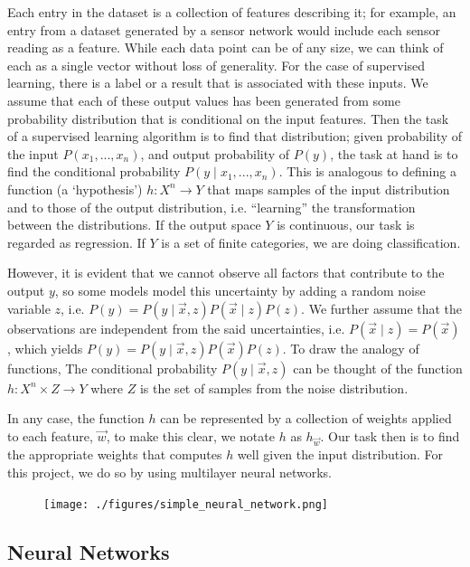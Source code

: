 \documentclass[12pt,a4paper,]{report}
\begin{document}
Each entry in the dataset is a collection of features describing it; for
example, an entry from a dataset generated by a sensor network would
include each sensor reading as a feature. While each data point can be
of any size, we can think of each as a single vector without loss of
generality. For the case of supervised learning, there is a label or a
result that is associated with these inputs. We assume that each of
these output values has been generated from some probability
distribution that is conditional on the input features. Then the task of
a supervised learning algorithm is to find that distribution; given
probability of the input \(P(x_1, ..., x_n)\), and output probability of
\(P(y)\), the task at hand is to find the conditional probability
\(P(y \mid x_1, ..., x_n)\). This is analogous to defining a function (a
`hypothesis') \(h: X^n \rightarrow Y\) that maps samples of the input
distribution and to those of the output distribution, i.e. ``learning''
the transformation between the distributions. If the output space \(Y\)
is continuous, our task is regarded as regression. If \(Y\) is a set of
finite categories, we are doing classification.

However, it is evident that we cannot observe all factors that
contribute to the output \(y\), so some models model this uncertainty by
adding a random noise variable \(z\), i.e.
\(P(y) = P(y \mid \vec{x}, z) P(\vec{x} \mid z) P(z)\). We further
assume that the observations are independent from the said
uncertainties, i.e. \(P(\vec{x} \mid z) = P(\vec{x})\), which yields
\(P(y) = P(y \mid \vec{x}, z) P(\vec{x}) P(z)\). To draw the analogy of
functions, The conditional probability \(P(y \mid \vec{x}, z)\) can be
thought of the function \(h: X^n \times Z \rightarrow Y\) where \(Z\) is
the set of samples from the noise distribution.

In any case, the function \(h\) can be represented by a collection of
weights applied to each feature, \(\vec{w}\), to make this clear, we
notate \(h\) as \(h_{\vec{w}}\). Our task then is to find the
appropriate weights that computes \(h\) well given the input
distribution. For this project, we do so by using multilayer neural
networks.

\begin{figure}[h]
    \texttt{[image: ./figures/simple\_neural\_network.png]}
\centering
\caption{}
\end{figure}

\hypertarget{neural-networks}{%
\subsection{Neural Networks}\label{neural-networks}}
\end{document}
